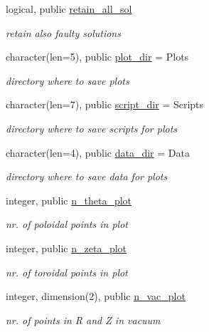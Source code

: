 \begin{DoxyCompactItemize}
logical, public \hyperlink{namespacenum__vars_adc6255c76bb27f763817adc8e2d80658}{retain\+\_\+all\+\_\+sol}
\begin{DoxyCompactList}\small\item\em retain also faulty solutions \end{DoxyCompactList}\item 
character(len=5), public \hyperlink{namespacenum__vars_a63868c5912af08559dcdd2db31e68696}{plot\+\_\+dir} = \textquotesingle{}Plots\textquotesingle{}
\begin{DoxyCompactList}\small\item\em directory where to save plots \end{DoxyCompactList}\item 
character(len=7), public \hyperlink{namespacenum__vars_a2b5f419579cb2d0ac2adda364be58fb5}{script\+\_\+dir} = \textquotesingle{}Scripts\textquotesingle{}
\begin{DoxyCompactList}\small\item\em directory where to save scripts for plots \end{DoxyCompactList}\item 
character(len=4), public \hyperlink{namespacenum__vars_af48173a7062997585f7a7ca9363290b3}{data\+\_\+dir} = \textquotesingle{}Data\textquotesingle{}
\begin{DoxyCompactList}\small\item\em directory where to save data for plots \end{DoxyCompactList}\item 
integer, public \hyperlink{namespacenum__vars_a0c3d2a6eea73c4d47f30df016475b585}{n\+\_\+theta\+\_\+plot}
\begin{DoxyCompactList}\small\item\em nr. of poloidal points in plot \end{DoxyCompactList}\item 
integer, public \hyperlink{namespacenum__vars_a657b74ac497053e3c848796f1afaca5f}{n\+\_\+zeta\+\_\+plot}
\begin{DoxyCompactList}\small\item\em nr. of toroidal points in plot \end{DoxyCompactList}\item 
integer, dimension(2), public \hyperlink{namespacenum__vars_a5331aef164e788f0e3aa354ea8059a01}{n\+\_\+vac\+\_\+plot}
\begin{DoxyCompactList}\small\item\em nr. of points in R and Z in vacuum \end{DoxyCompactList}\item 

\end{DoxyCompactItemize}
